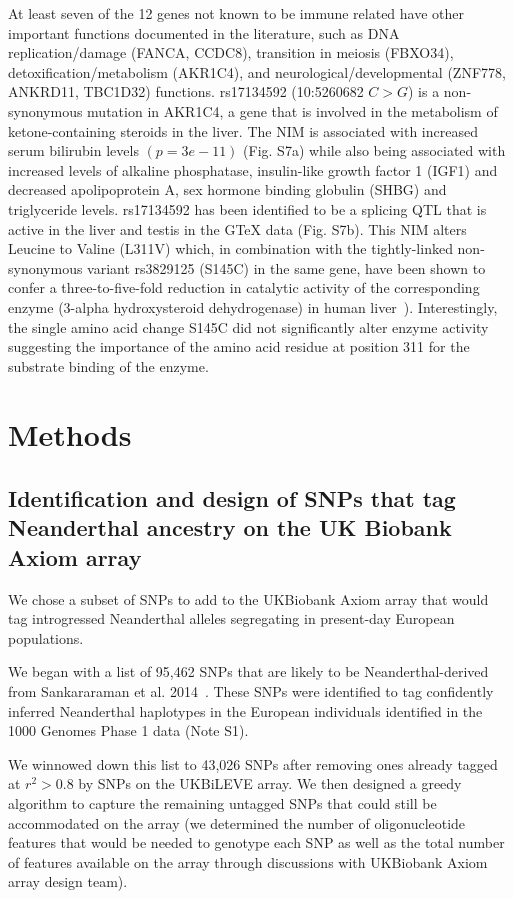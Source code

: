At least seven of the 12 genes not known to be immune related have other important functions documented in the literature, such as DNA replication/damage (FANCA, CCDC8), transition in meiosis (FBXO34), detoxification/metabolism (AKR1C4), and neurological/developmental (ZNF778, ANKRD11, TBC1D32) functions. rs17134592 (10:5260682 $C>G$) is a non-synonymous mutation in AKR1C4, a gene that is involved in the metabolism of ketone-containing steroids in the liver. The NIM is associated with increased serum bilirubin levels $(p = 3e-11)$  (Fig. S7a) while also being associated with increased levels of alkaline phosphatase, insulin-like growth factor 1 (IGF1) and decreased apolipoprotein A, sex hormone binding globulin (SHBG) and triglyceride levels.  rs17134592 has been identified to be a splicing QTL that is active in the liver and testis in the GTeX data (Fig. S7b). This NIM alters Leucine to Valine (L311V) which, in combination with the tightly-linked non-synonymous variant rs3829125 (S145C) in the same gene, have been shown to confer a three-to-five-fold reduction in catalytic activity of the corresponding enzyme (3-alpha hydroxysteroid dehydrogenase) in human liver~\cite{kume1999characterization}). Interestingly, the single amino acid change S145C did not significantly alter enzyme activity suggesting the importance of the amino acid residue at position 311 for the substrate binding of the enzyme.
\section{Methods}
\subsection{Identification and design of SNPs that tag Neanderthal ancestry on the UK Biobank Axiom array} \label{3.3.1}
We chose a subset of SNPs to add to the UKBiobank Axiom array that would tag introgressed Neanderthal alleles segregating in present-day European populations.
 
We began with a list of 95,462 SNPs that are likely to be Neanderthal-derived from Sankararaman et al. 2014~\cite{sankararaman2014genomic}. These SNPs were identified to tag confidently inferred Neanderthal haplotypes in the European individuals identified in the 1000 Genomes Phase 1 data (Note S1).

We winnowed down this list to 43,026 SNPs after removing ones already tagged at $r^2>0.8$ by SNPs on the UKBiLEVE array. We then designed a greedy algorithm to capture the remaining untagged SNPs that could still be accommodated on the array (we determined the number of oligonucleotide features that would be needed to genotype each SNP as well as the total number of features available on the array through discussions with UKBiobank Axiom array design team).

